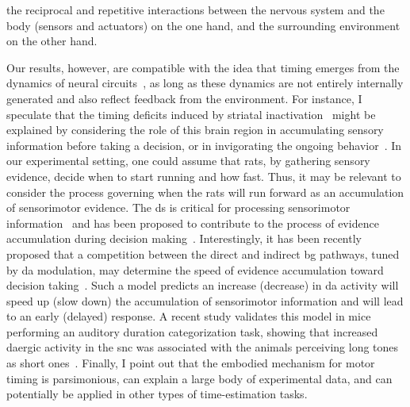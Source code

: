     the reciprocal and repetitive interactions between the nervous system and the body (sensors and actuators) on the one hand, and the surrounding environment on the other hand.
\par
Our results, however, are compatible with the idea that timing emerges from the dynamics of neural circuits~\cite{Paton2018NeuronRev}, as long as these dynamics are not entirely internally generated and also reflect feedback from the environment.
For instance, I speculate that the timing deficits induced by striatal inactivation~\cite{Rueda2015NN} might be explained by considering the role of this brain region in accumulating sensory information before taking a decision, or in invigorating the ongoing behavior~\cite[][more on the role of the striatum later on]{Yartsev2018eLife,Dunovan2016FrontNeurosci}.
In our experimental setting, one could assume that rats, by gathering sensory evidence, decide when to start running and how fast.
Thus, it may be relevant to consider the process governing when the rats will run forward as an accumulation of sensorimotor evidence.
The \gls{ds} is critical for processing sensorimotor information~\cite{Robbe2018} and has been proposed to contribute to the process of evidence accumulation during decision making~\cite{Yartsev2018eLife}.
Interestingly, it has been recently proposed that a competition between the direct and indirect \gls{bg} pathways, tuned by \gls{da} modulation, may determine the speed of evidence accumulation toward decision taking~\cite{Dunovan2016FrontNeurosci}.
Such a model predicts an increase (decrease) in \gls{da} activity will speed up (slow down) the accumulation of sensorimotor information and will lead to an early (delayed) response.
A recent study validates this model in mice performing an auditory duration categorization task, showing that increased \gls{da}ergic activity in the \gls{snc} was associated with the animals perceiving long tones as short ones~\cite{Paton2016Sci}.
Finally, I point out that the embodied mechanism for motor timing is parsimonious, can explain a large body of experimental data, and can potentially be applied in other types of time-estimation tasks.